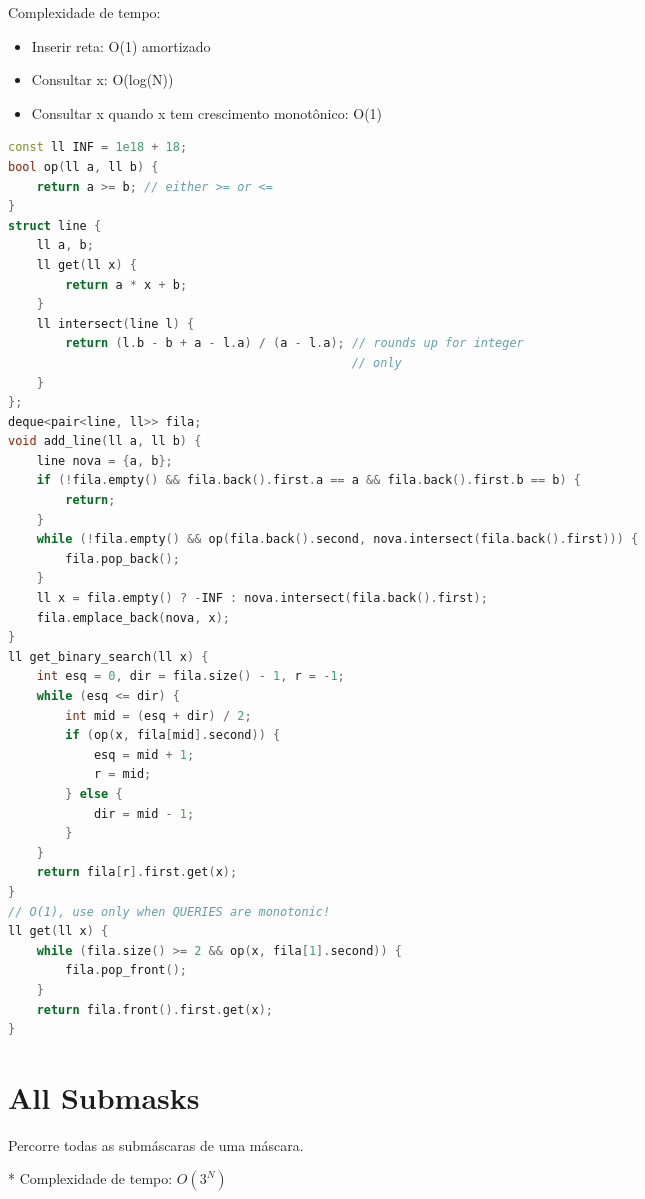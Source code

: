 \documentclass[11pt, a4paper, oneside]{book}
\begin{document}
Complexidade de tempo:



\begin{itemize}
\item Inserir reta: O(1) amortizado
\item Consultar x: O(log(N))
\item Consultar x quando x tem crescimento monotônico: O(1)
\end{itemize}

\hfill

\begin{multicols}{2}
\begin{lstlisting}[language=C++]
const ll INF = 1e18 + 18;
bool op(ll a, ll b) {
    return a >= b; // either >= or <=
}
struct line {
    ll a, b;
    ll get(ll x) {
        return a * x + b;
    }
    ll intersect(line l) {
        return (l.b - b + a - l.a) / (a - l.a); // rounds up for integer
                                                // only
    }
};
deque<pair<line, ll>> fila;
void add_line(ll a, ll b) {
    line nova = {a, b};
    if (!fila.empty() && fila.back().first.a == a && fila.back().first.b == b) {
        return;
    }
    while (!fila.empty() && op(fila.back().second, nova.intersect(fila.back().first))) {
        fila.pop_back();
    }
    ll x = fila.empty() ? -INF : nova.intersect(fila.back().first);
    fila.emplace_back(nova, x);
}
ll get_binary_search(ll x) {
    int esq = 0, dir = fila.size() - 1, r = -1;
    while (esq <= dir) {
        int mid = (esq + dir) / 2;
        if (op(x, fila[mid].second)) {
            esq = mid + 1;
            r = mid;
        } else {
            dir = mid - 1;
        }
    }
    return fila[r].first.get(x);
}
// O(1), use only when QUERIES are monotonic!
ll get(ll x) {
    while (fila.size() >= 2 && op(x, fila[1].second)) {
        fila.pop_front();
    }
    return fila.front().first.get(x);
}
\end{lstlisting}
\end{multicols}

\hfill

\section{All Submasks}


Percorre todas as submáscaras de uma máscara.



* Complexidade de tempo: $O(3^N)$

\hfill
\end{document}
